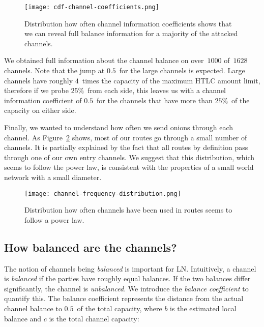 \begin{figure}[]
	\centering
	\texttt{[image: cdf-channel-coefficients.png]}
	\caption{Distribution how often channel information coefficients shows that we can reveal full balance information for a majority of the attacked channels.}
	\label{fig:cdf-channel-coefficients}
\end{figure}

We obtained full information about the channel balance on over~$1000$ of~$1628$ channels.
Note that the jump at $0.5$~for the large channels is expected.
Large channels have roughly $4$~times the capacity of the maximum HTLC amount limit, therefore if we probe $25\%$~from each side, this leaves us with a channel information coefficient of $0.5$~for the channels that have more than $25\%$~of the capacity on either side.

Finally, we wanted to understand how often we send onions through each channel.
As Figure~\ref{fig:channel-frequency-distribution} shows, most of our routes go through a small number of channels.
It is partially explained by the fact that all routes by definition pass through one of our own entry channels.
We suggest that this distribution, which seems to follow the power law, is consistent with the properties of a small world network with a small diameter.

\begin{figure}[]
	\centering
	\texttt{[image: channel-frequency-distribution.png]}
	\caption{Distribution how often channels have been used in routes seems to follow a power law.}
	\label{fig:channel-frequency-distribution}
\end{figure}


\subsection{How balanced are the channels?}
The notion of channels being \textit{balanced} is important for LN.
Intuitively, a channel is \textit{balanced} if the parties have roughly equal balances.
If the two balances differ significantly, the channel is \textit{unbalanced}.
We introduce the \textit{balance coefficient} to quantify this.
The balance coefficient represents the distance from the actual channel balance to $0.5$~of the total capacity, where $b$ is the estimated local balance and $c$ is the total channel capacity:

